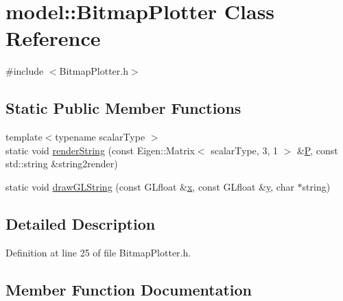 \hypertarget{classmodel_1_1_bitmap_plotter}{}\section{model\+:\+:Bitmap\+Plotter Class Reference}
\label{classmodel_1_1_bitmap_plotter}


{\ttfamily \#include $<$Bitmap\+Plotter.\+h$>$}

\subsection*{Static Public Member Functions}
\begin{DoxyCompactItemize}
\item 
{\footnotesize template$<$typename scalar\+Type $>$ }\\static void \hyperlink{classmodel_1_1_bitmap_plotter_a194c6706226150c119f4edd156751dcb}{render\+String} (const Eigen\+::\+Matrix$<$ scalar\+Type, 3, 1 $>$ \&\hyperlink{_f_e_m_2linear__elasticity__3d_2tetgen_2generate_p_o_l_ycube_8m_a50a9afb44201a65ab7ad5feb2150aeb6}{P}, const std\+::string \&string2render)
\item 
static void \hyperlink{classmodel_1_1_bitmap_plotter_a979a27e34dce89333ea8198590c86ce8}{draw\+G\+L\+String} (const G\+Lfloat \&\hyperlink{generate_s_t_lcyl_8m_a9336ebf25087d91c818ee6e9ec29f8c1}{x}, const G\+Lfloat \&\hyperlink{generate_s_t_lcyl_8m_a2fb1c5cf58867b5bbc9a1b145a86f3a0}{y}, char $\ast$string)
\end{DoxyCompactItemize}


\subsection{Detailed Description}


Definition at line 25 of file Bitmap\+Plotter.\+h.



\subsection{Member Function Documentation}
\hypertarget{classmodel_1_1_bitmap_plotter_a979a27e34dce89333ea8198590c86ce8}{}

